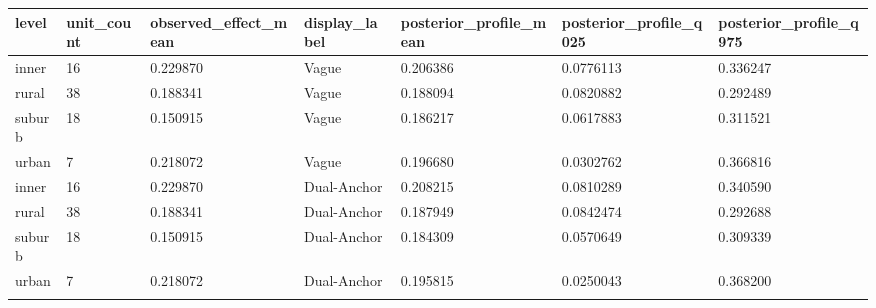 \begin{longtable}{lllllll}
\toprule
level & unit\_count & observed\_effect\_mean & display\_label & posterior\_profile\_mean & posterior\_profile\_q025 & posterior\_profile\_q975 \\
\midrule\endhead
inner & 16 & 0.229870 & Vague & 0.206386 & 0.0776113 & 0.336247 \\ \addlinespace[3pt]
rural & 38 & 0.188341 & Vague & 0.188094 & 0.0820882 & 0.292489 \\ \addlinespace[3pt]
suburb & 18 & 0.150915 & Vague & 0.186217 & 0.0617883 & 0.311521 \\ \addlinespace[3pt]
urban & 7 & 0.218072 & Vague & 0.196680 & 0.0302762 & 0.366816 \\ \addlinespace[3pt]
inner & 16 & 0.229870 & Dual-Anchor & 0.208215 & 0.0810289 & 0.340590 \\ \addlinespace[3pt]
rural & 38 & 0.188341 & Dual-Anchor & 0.187949 & 0.0842474 & 0.292688 \\ \addlinespace[3pt]
suburb & 18 & 0.150915 & Dual-Anchor & 0.184309 & 0.0570649 & 0.309339 \\ \addlinespace[3pt]
urban & 7 & 0.218072 & Dual-Anchor & 0.195815 & 0.0250043 & 0.368200 \\ \addlinespace[3pt]
\bottomrule\end{longtable}

